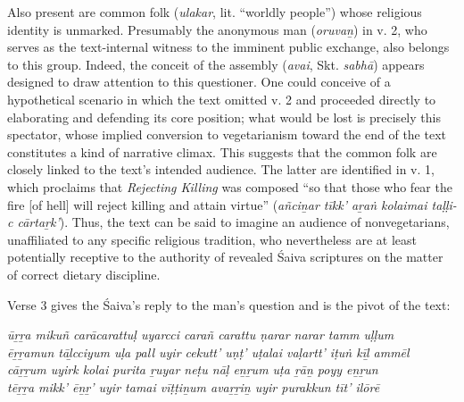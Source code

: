 Also present are common folk (\emph{ulakar}, lit. “worldly people”) whose religious identity is unmarked. Presumably the anonymous man (\emph{oruvaṉ}) in v. 2, who serves as the text-internal witness to the imminent public exchange, also belongs to this group. Indeed, the conceit of the assembly (\emph{avai}, Skt. \emph{sabhā}) appears designed to draw attention to this questioner. One could conceive of a hypothetical scenario in which the text omitted v. 2 and proceeded directly to elaborating and defending its core position; what would be lost is precisely this spectator, whose implied conversion to vegetarianism toward the end of the text constitutes a kind of narrative climax. This suggests that the common folk are closely linked to the text’s intended audience. The latter are identified in v. 1, which proclaims that \emph{Rejecting Killing} was composed “so that those who fear the fire [of hell] will reject killing and attain virtue” (\emph{añciṉar tīkk’ aṟaṅ kolaimai taḷḷi-c cārtaṟk’}). Thus, the text can be said to imagine an audience of nonvegetarians, unaffiliated to any specific religious tradition, who nevertheless are at least potentially receptive to the authority of revealed Śaiva scriptures on the matter of correct dietary discipline. 


Verse 3 gives the Śaiva’s reply to the man’s question and is the pivot of the text:

\begin{pullquote}\raggedright
      \emph{ūṟṟa mikuñ carācarattuḷ uyarcci carañ carattu ṇarar narar tamm uḷḷum}\\
\emph{ēṟṟamun tāḻcciyum uḷa pall uyir cekutt’ uṇṭ’ uṭalai vaḷartt’ iṭuṅ kīḻ ammēl}\\
\emph{cāṟṟum uyirk kolai purita ṟuyar neṭu nāḷ eṉṟum uṭa ṟāṉ poyy eṉṟun}\\
\emph{tēṟṟa mikk’ ēṉṟ’ uyir tamai vīṭṭiṉum avaṟṟiṉ uyir purakkun tīt’ ilōrē}
\end{pullquote}
      
